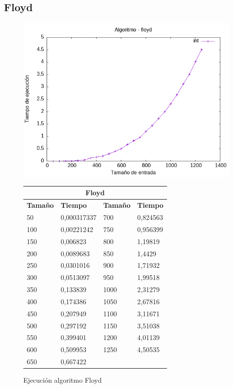 \documentclass[11pt]{article}
\begin{document}
\subsection*{Floyd}
\begin{figure}[H]
    \begin{minipage}{0.5\textwidth}
        \centering
        \includegraphics[width=\linewidth]{assets/Img/floydint.png}
        \caption{Ejecución algoritmo Floyd}
        \label{fig:floyd}
    \end{minipage}
    \begin{minipage}{0.5\textwidth}
        \centering
        \small
        \begin{tabular}{|l|l|l|l|}
        \hline
        \multicolumn{4}{|c|}{\cellcolor{blue!20}\textbf{Floyd}} \\ \hline 
        \textbf{Tamaño} & \textbf{Tiempo} & \textbf{Tamaño} & \textbf{Tiempo} \\ \hline
        50 & 0,000317337 & 700 & 0,824563 \\ \hline
        100 & 0,00221242 & 750 & 0,956399 \\ \hline
        150 & 0,006823 & 800 & 1,19819 \\ \hline
        200 & 0,0089683 & 850 & 1,4429 \\ \hline
        250 & 0,0301016 & 900 & 1,71932 \\ \hline
        300 & 0,0513097 & 950 & 1,99518 \\ \hline
        350 & 0,133839 & 1000 & 2,31279 \\ \hline
        400 & 0,174386 & 1050 & 2,67816 \\ \hline
        450 & 0,207949 & 1100 & 3,11671 \\ \hline
        500 & 0,297192 & 1150 & 3,51038 \\ \hline
        550 & 0,399401 & 1200 & 4,01139 \\ \hline
        600 & 0,509953 & 1250 & 4,50535 \\ \hline
        650 & 0,667422 & ~ & \\ \hline
        \end{tabular}
    \end{minipage}
\end{figure}
\end{document}
